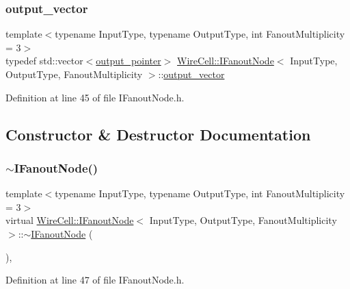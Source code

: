 \subsubsection{\texorpdfstring{output\+\_\+vector}{output\_vector}}
{\footnotesize\ttfamily template$<$typename Input\+Type, typename Output\+Type, int Fanout\+Multiplicity = 3$>$ \\
typedef std\+::vector$<$\hyperlink{class_wire_cell_1_1_i_fanout_node_a35939afef5c102eaee685b52c4beaf04}{output\+\_\+pointer}$>$ \hyperlink{class_wire_cell_1_1_i_fanout_node}{Wire\+Cell\+::\+I\+Fanout\+Node}$<$ Input\+Type, Output\+Type, Fanout\+Multiplicity $>$\+::\hyperlink{class_wire_cell_1_1_i_fanout_node_a650cda83709781daac2d67af7c3706df}{output\+\_\+vector}}



Definition at line 45 of file I\+Fanout\+Node.\+h.



\subsection{Constructor \& Destructor Documentation}
\mbox{\label{class_wire_cell_1_1_i_fanout_node_a01b90f003e19845b9c4bf3d1c85b75e7}} 
\subsubsection{\texorpdfstring{$\sim$\+I\+Fanout\+Node()}{~IFanoutNode()}}
{\footnotesize\ttfamily template$<$typename Input\+Type, typename Output\+Type, int Fanout\+Multiplicity = 3$>$ \\
virtual \hyperlink{class_wire_cell_1_1_i_fanout_node}{Wire\+Cell\+::\+I\+Fanout\+Node}$<$ Input\+Type, Output\+Type, Fanout\+Multiplicity $>$\+::$\sim$\hyperlink{class_wire_cell_1_1_i_fanout_node}{I\+Fanout\+Node} (\begin{DoxyParamCaption}{ }\end{DoxyParamCaption})\hspace{0.3cm}{\ttfamily [inline]}, {\ttfamily [virtual]}}



Definition at line 47 of file I\+Fanout\+Node.\+h.




